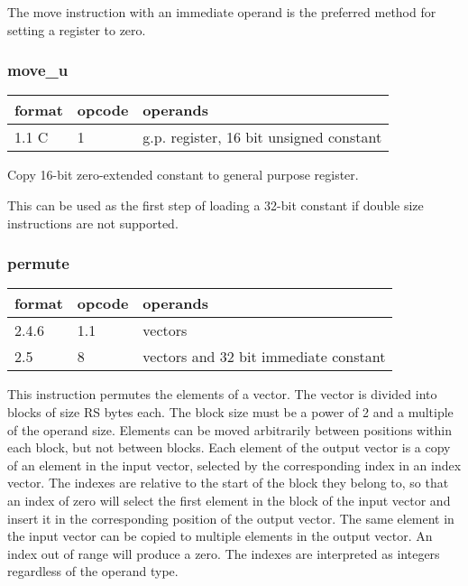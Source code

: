 \documentclass[forwardcom.tex]{subfiles}
\begin{document}
The move instruction with an immediate operand is the preferred method for setting a register to zero.


\subsubsection{move\_u}
\label{table:moveUInstruction}
\begin{tabular}{|p{12mm}|p{12mm}|p{110mm}|}
\hline
\bfseries format & \bfseries opcode & \bfseries operands \\ \hline
1.1 C & 1 & g.p. register, 16 bit unsigned constant \\ \hline
\end{tabular}
\vspace{2mm}

Copy 16-bit zero-extended constant to general
purpose register.

This can be used as the first step of loading a 32-bit constant if double size instructions are not supported.

\subsubsection{permute}
\label{table:permuteInstruction}
\begin{tabular}{|p{12mm}|p{12mm}|p{110mm}|}
\hline
\bfseries format & \bfseries opcode & \bfseries operands \\ \hline
2.4.6 & 1.1 & vectors \\ \hline
2.5   & 8   & vectors and 32 bit immediate constant \\ \hline
\end{tabular}
\vspace{2mm}

This instruction permutes the elements of a vector. The vector is divided into blocks of size RS bytes each. The block size must be a power of 2 and a multiple of the operand size. Elements can be moved arbitrarily between positions within each block, but not between blocks. Each element of the output vector is a copy of an element in the input vector, selected by the corresponding index in an index vector. The indexes are relative to the start of the block they belong to, so that an index of zero will select the first element in the block of the input vector and insert it in the corresponding position of the output vector. The same element in the input vector can be copied to multiple elements in the output vector. An index out of range will produce a zero. The indexes are interpreted as  integers regardless of the operand type.
\vspace{2mm}
\end{document}
